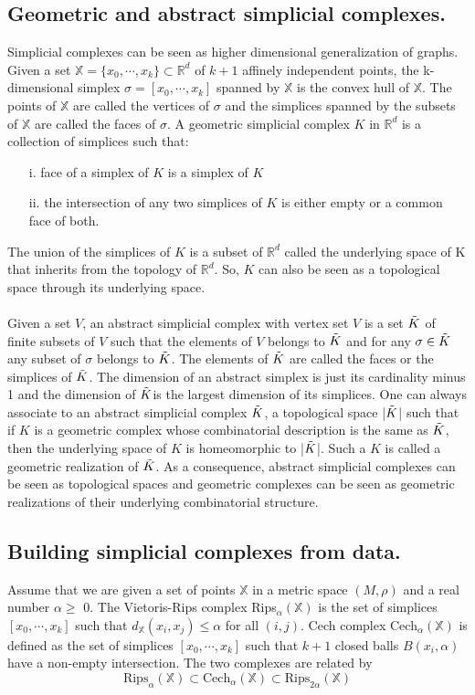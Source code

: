 \subsection{Geometric and abstract simplicial complexes.} Simplicial complexes can be seen as higher dimensional generalization of graphs. Given a set $\mathbb{X} = \{x_0,\cdots, x_k\} \subset \mathbb{R}^d$ of $k+1$ affinely independent points, the k-dimensional simplex $\sigma = [x_0,\cdots,x_k]$ spanned by $\mathbb{X}$ is the convex hull of $\mathbb{X}$. The points of $\mathbb{X}$ are called the vertices of $\sigma$ and the simplices spanned by the subsets of $\mathbb{X}$ are called the faces of $\sigma$. A geometric simplicial complex $K$ in $\mathbb{R}^d$ is a collection of simplices such that:
\begin{enumerate}
    \item[i.] face of a simplex of $K$ is a simplex of $K$
    \item[ii.] the intersection of any two simplices of $K$ is either empty or a common face of both.
\end{enumerate}
The union of the simplices of $K$ is a subset of $\mathbb{R}^d$ called the underlying space of K that inherits from the topology of $\mathbb{R}^d$. So, $K$ can also be seen as a topological space through its underlying
space. \\\\
Given a set $V$, an abstract simplicial complex with vertex set $V$ is a set $\Tilde{K}$ of finite subsets of $V$ such that the elements of $V$ belongs to $\Tilde{K}$ and for any $\sigma \in \Tilde{K}$ any subset of $\sigma$ belongs to $\Tilde{K}$. The elements of $\Tilde{K}$ are called the faces or the simplices of $\Tilde{K}$. The dimension of an abstract simplex is just its cardinality minus 1 and the dimension of $\Tilde{K}$is the largest dimension of its simplices. One can always associate to an abstract simplicial
complex $\Tilde{K}$, a topological space |$\Tilde{K}$| such that if $K$ is a geometric complex whose combinatorial description is the same as $\Tilde{K}$, then the underlying space of $K$ is homeomorphic to |$\Tilde{K}$|. Such a $K$ is called a geometric realization of $\Tilde{K}$. As a consequence, abstract simplicial complexes can be seen as topological spaces and geometric complexes can be seen as geometric realizations of their underlying combinatorial structure.
\subsection{Building simplicial complexes from data.} 
Assume that we are given a set of points $\mathbb{X}$ in a metric space $(M, \rho)$ and a real number $\alpha \geq $ 0. The Vietoris-Rips complex Rips$_\alpha(\mathbb{X})$ is the set of simplices $[x_0, \cdots, x_k]$ such that $d_{\mathbb{X}}(x_i, x_j) \leq \alpha$ for all $(i, j)$. Cech complex Cech$_\alpha(\mathbb{X})$ is defined as the set of simplices $[x_0,\cdots, x_k]$ such that $k+1$ closed balls $B(x_i,\alpha)$ have a non-empty intersection. The two complexes are related by \[\text{Rips}_\alpha(\mathbb{X}) \subset \text{Cech}_\alpha(\mathbb{X}) \subset \text{Rips}_{2\alpha}(\mathbb{X})\]
